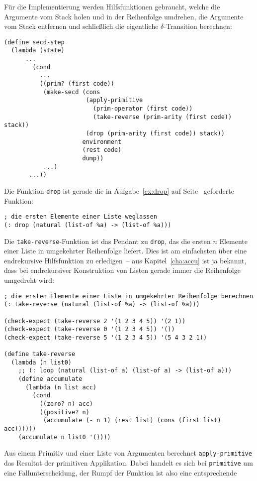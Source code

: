 %
Für die Implementierung werden Hilfsfunktionen gebraucht, welche die
Argumente vom Stack holen und in der Reihenfolge umdrehen, die
Argumente vom Stack entfernen und schließlich die eigentliche
$\delta$-Transition berechnen:
%
\begin{lstlisting}
(define secd-step
  (lambda (state)
      ...
        (cond
          ...
          ((prim? (first code))
           (make-secd (cons
                       (apply-primitive
                         (prim-operator (first code))
                         (take-reverse (prim-arity (first code)) stack))
                       (drop (prim-arity (first code)) stack))
                      environment
                      (rest code)
                      dump))
           ...)
       ...))
\end{lstlisting}
%
Die Funktion \lstinline{drop} ist gerade die in
Aufgabe~\ref{ex:drop} auf Seite~\pageref{ex:drop} geforderte Funktion:
%
\begin{lstlisting}
; die ersten Elemente einer Liste weglassen
(: drop (natural (list-of %a) -> (list-of %a)))
\end{lstlisting}
%
Die \lstinline{take-reverse}-Funktion ist das Pendant zu \lstinline{drop},
das die ersten $n$ Elemente einer Liste in umgekehrter Reihenfolge
liefert.  Dies ist am einfachsten über eine endrekursive Hilfsfunktion
zu erledigen~-- aus Kapitel~\ref{cha:accu} ist ja bekannt, dass bei
endrekursiver Konstruktion von Listen gerade immer die Reihenfolge
umgedreht wird:
%
\begin{lstlisting}
; die ersten Elemente einer Liste in umgekehrter Reihenfolge berechnen
(: take-reverse (natural (list-of %a) -> (list-of %a)))

(check-expect (take-reverse 2 '(1 2 3 4 5)) '(2 1))
(check-expect (take-reverse 0 '(1 2 3 4 5)) '())
(check-expect (take-reverse 5 '(1 2 3 4 5)) '(5 4 3 2 1))

(define take-reverse
  (lambda (n list0)
    ;; (: loop (natural (list-of a) (list-of a) -> (list-of a)))
    (define accumulate
      (lambda (n list acc)
        (cond
          ((zero? n) acc)
          ((positive? n)
           (accumulate (- n 1) (rest list) (cons (first list) acc))))))
    (accumulate n list0 '())))
\end{lstlisting}
%
Aus einem Primitiv und einer Liste von Argumenten berechnet
\lstinline{apply-primitive} das Resultat der primitiven Applikation.
Dabei handelt es sich bei \lstinline{primitive} um eine
Fallunterscheidung, der Rumpf der Funktion ist also eine entsprechende
